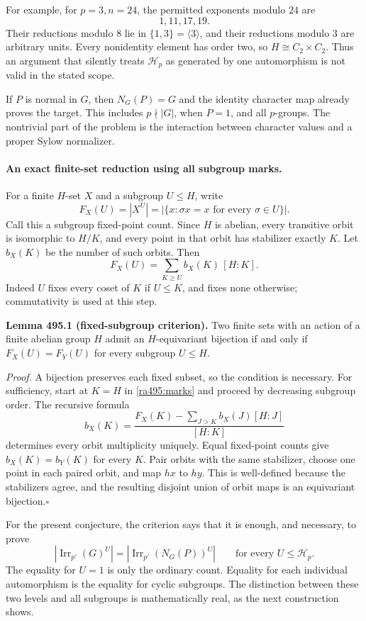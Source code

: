 \documentclass[11pt]{article}
\begin{document}
For example, for $p=3,n=24$, the permitted exponents modulo $24$ are
\[
 1,11,17,19.
\]
Their reductions modulo $8$ lie in $\{1,3\}=\langle3\rangle$, and
their reductions modulo $3$ are arbitrary units. Every nonidentity
element has order two, so $H\cong C_2\times C_2$.
Thus an argument that silently treats $\mathcal H_p$ as generated by
one automorphism is not valid in the stated scope.

If $P$ is normal in $G$, then $N_G(P)=G$ and the identity character map
already proves the target. This includes $p\nmid|G|$, when $P=1$,
and all $p$-groups. The nontrivial part of the problem is the interaction
between character values and a proper Sylow normalizer.

\paragraph{An exact finite-set reduction using all subgroup marks.}
For a finite $H$-set $X$ and a subgroup $U\leq H$, write
\[
 F_X(U)=|X^U|=|\{x:\sigma x=x\text{ for every }\sigma\in U\}|.
\]
Call this a subgroup fixed-point count. Since $H$ is abelian, every
transitive orbit is isomorphic to $H/K$, and every point in that orbit
has stabilizer exactly $K$. Let $b_X(K)$ be the number of such orbits.
Then
\begin{equation}\label{ra495:marks}
 F_X(U)=\sum_{K\geq U} b_X(K)\,[H:K].
\end{equation}
Indeed $U$ fixes every coset of $K$ if $U\leq K$, and fixes none
otherwise; commutativity is used at this step.

\textbf{Lemma 495.1 (fixed-subgroup criterion).}
Two finite sets with an action of a finite abelian group $H$ admit an
$H$-equivariant bijection if and only if
$F_X(U)=F_Y(U)$ for every subgroup $U\leq H$.

\emph{Proof.}
A bijection preserves each fixed subset, so the condition is necessary.
For sufficiency, start at $K=H$ in \eqref{ra495:marks} and proceed by
decreasing subgroup order. The recursive formula
\[
 b_X(K)=\frac{F_X(K)-\sum_{J>K}b_X(J)[H:J]}{[H:K]}
\]
determines every orbit multiplicity uniquely. Equal fixed-point counts
give $b_X(K)=b_Y(K)$ for every $K$. Pair orbits with the same stabilizer,
choose one point in each paired orbit, and map $h x$ to $h y$.
This is well-defined because the stabilizers agree, and the resulting
disjoint union of orbit maps is an equivariant bijection.\hfill$\square$

For the present conjecture, the criterion says that it is enough, and
necessary, to prove
\begin{equation}\label{ra495:targetmarks}
 |\operatorname{Irr}_{p'}(G)^U|
   =|\operatorname{Irr}_{p'}(N_G(P))^U|
                 \qquad\text{for every }U\leq\mathcal H_p.
\end{equation}
The equality for $U=1$ is only the ordinary count. Equality for each
individual automorphism is the equality for cyclic subgroups. The
distinction between these two levels and all subgroups is mathematically
real, as the next construction shows.
\end{document}
